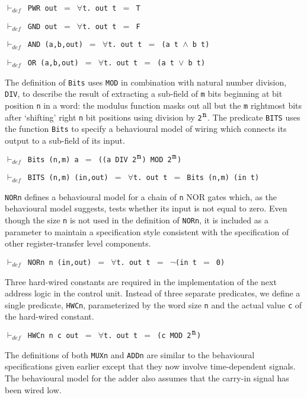 \begin{normalsize}
$\vdash_{def}$\verb" PWR out "$=$\verb" "$\forall$\verb"t. out t "$=$\verb" T"

$\vdash_{def}$\verb" GND out "$=$\verb" "$\forall$\verb"t. out t "$=$\verb" F"

$\vdash_{def}$\verb" AND (a,b,out) "$=$\verb" "$\forall$\verb"t. out t "$=$\verb" (a t "$\wedge$\verb" b t)"

$\vdash_{def}$\verb" OR (a,b,out) "$=$\verb" "$\forall$\verb"t. out t "$=$\verb" (a t "$\vee$\verb" b t)"

The definition of \verb"Bits" uses \verb"MOD" in combination
with natural number division, \verb"DIV", to describe the result
of extracting a \mbox{sub-field}
of \verb"m" bits beginning at bit position \verb"n" in a word:
the modulus function masks out all but the \verb"m" rightmost bits after
`shifting' right \verb"n" bit positions
using division by \mbox{\verb"2"$^{\verb"n"}$}.
The predicate \verb"BITS" uses the function \verb"Bits" to
specify a behavioural model of wiring which connects
its output to a sub-field of its input.

$\vdash_{def}$\verb" Bits (n,m) a "$=$\verb" ((a DIV 2"$^{\verb"n"}$\verb") MOD 2"$^{\verb"m"}$\verb")"

$\vdash_{def}$\verb" BITS (n,m) (in,out) "$=$\verb" "$\forall$\verb"t. out t "$=$\verb" Bits (n,m) (in t)"

\verb"NORn" defines a behavioural model for a chain of \verb"n" NOR gates
which, as the behavioural model suggests, tests whether its input is not
equal to zero.
Even though the size \verb"n" is not used in the definition
of \verb"NORn", it is included as a parameter to maintain a specification
style consistent with the specification of other register-transfer level
components.

$\vdash_{def}$\verb" NORn n (in,out) "$=$\verb" "$\forall$\verb"t. out t "$=$\verb" "$\neg$\verb"(in t "$=$\verb" 0)"

Three hard-wired constants are required in the implementation of the
next address logic in the control unit.
Instead of three separate predicates,
we define a single predicate, \verb"HWCn", parameterized by
the word size \verb"n" and the actual value
\verb"c" of the hard-wired constant.

$\vdash_{def}$\verb" HWCn n c out "$=$\verb" "$\forall$\verb"t. out t "$=$\verb" (c MOD 2"$^{\verb"n"}$\verb")"

The definitions of both \verb"MUXn" and \verb"ADDn" are similar to
the behavioural specifications given earlier
except that they now involve time-dependent signals.
The behavioural model for the adder also assumes that the carry-in signal
has been wired low.


\end{normalsize}

